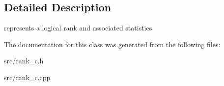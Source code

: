 \subsection{Detailed Description}
represents a logical rank and associated statistics 

The documentation for this class was generated from the following files:\begin{CompactItemize}
\item 
src/rank\_\-c.h\item 
src/rank\_\-c.cpp\end{CompactItemize}
